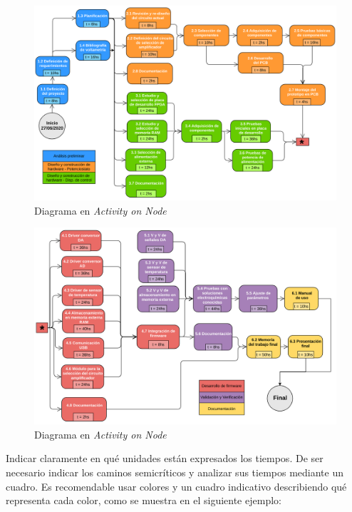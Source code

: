 \documentclass[11pt]{charter}
\begin{document}
\begin{figure}[htpb]
\centering 
\includegraphics[width=1\textwidth]{./Figuras/Activity-On-Node1.png}
\caption{Diagrama en \textit{Activity on Node}}
\label{fig:AoN1}
\end{figure}

\begin{figure}[htpb]
\centering 
\includegraphics[width=1\textwidth]{./Figuras/Activity-On-Node2.png}
\caption{Diagrama en \textit{Activity on Node}}
\label{fig:AoN2}
\end{figure}

Indicar claramente en qué unidades están expresados los tiempos.
De ser necesario indicar los caminos semicríticos y analizar sus tiempos mediante un cuadro.
Es recomendable usar colores y un cuadro indicativo describiendo qué representa cada color, como se muestra en el siguiente ejemplo:
\end{document}
